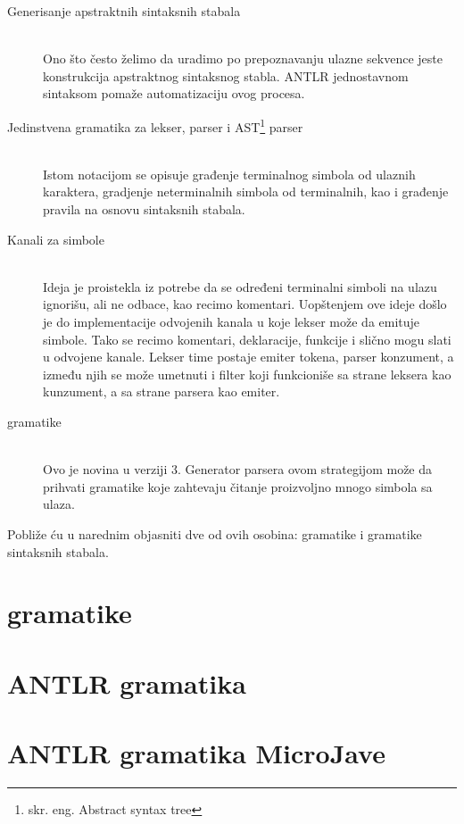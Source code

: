\begin{description}
	\item[Generisanje apstraktnih sintaksnih stabala] \hfill \\
	Ono što često želimo da uradimo po prepoznavanju ulazne sekvence jeste konstrukcija apstraktnog sintaksnog stabla. ANTLR jednostavnom sintaksom pomaže automatizaciju ovog procesa.
	\item[Jedinstvena gramatika za lekser, parser i AST\footnote{skr. eng. Abstract syntax tree}  parser] \hfill \\
	Istom notacijom se opisuje građenje terminalnog simbola od ulaznih karaktera, gradjenje neterminalnih simbola od terminalnih, kao i građenje pravila na osnovu sintaksnih stabala.
	\item[Kanali za simbole] \hfill \\
	Ideja je proistekla iz potrebe da se određeni terminalni simboli na ulazu ignorišu, ali ne odbace, kao recimo komentari. Uopštenjem ove ideje došlo je do implementacije odvojenih kanala u koje lekser može da emituje simbole. Tako se recimo komentari, deklaracije, funkcije i slično mogu slati u odvojene kanale. Lekser time postaje emiter tokena, parser konzument, a između njih se može umetnuti i filter koji funkcioniše sa strane leksera kao kunzument, a sa strane parsera kao emiter.
	\item [\LLa gramatike] \hfill \\
	Ovo je novina u verziji 3. Generator parsera ovom strategijom može da prihvati gramatike koje zahtevaju čitanje proizvoljno mnogo simbola sa ulaza.

\end{description}

Pobliže ću u narednim objasniti dve od ovih osobina: \LLa gramatike i gramatike sintaksnih stabala.

\section{\LLa gramatike}



\section{ANTLR gramatika}


\section{ANTLR gramatika MicroJave}
